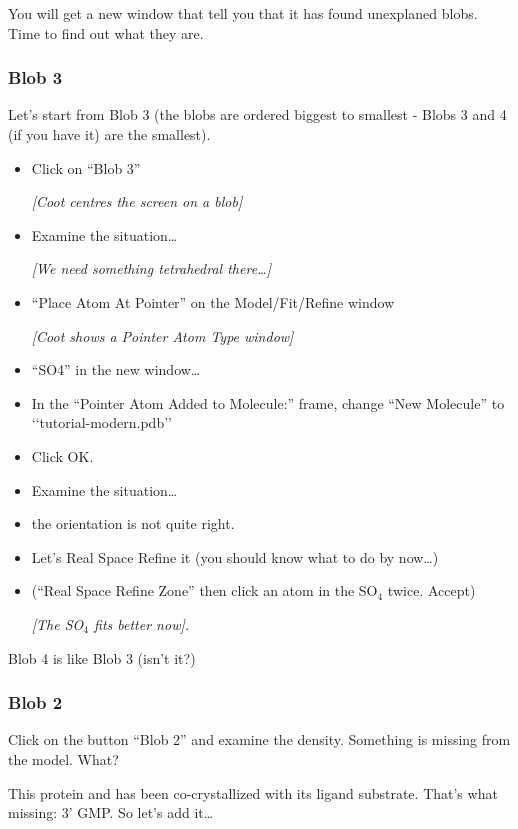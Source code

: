 \documentclass{article}
\begin{document}
You will get a new window that tell you that it has found unexplaned
blobs.  Time to find out what they are.

\subsubsection{Blob 3}
Let's start from Blob 3 (the blobs are ordered biggest to smallest -
Blobs 3 and 4 (if you have it) are the smallest).

\begin{itemize}
\item Click on ``Blob 3''

\textsl{ [Coot centres the screen on a blob]}

\item Examine the situation\ldots

  \emph{[We need something tetrahedral there\ldots]}
  
\item \textsf{``Place Atom At Pointer''} on the Model/Fit/Refine
  window

\textsl{ [Coot shows a Pointer Atom Type window]}

\item \textsf{``SO4''} in the new window\ldots
\item In the ``Pointer Atom Added to Molecule:'' frame, change ``New
  Molecule'' to `\textsf{`tutorial-modern.pdb''}
\item Click \textsf{OK}.
\item Examine the situation\ldots
\item the orientation is not quite right.
\item Let's Real Space Refine it (you should know what to do by now\ldots)
\item (\textsf{``Real Space Refine Zone''} then click an atom in the
  SO$_4$ twice.  Accept)

\textsl{[The SO$_4$ fits better now].}

\end{itemize}

Blob 4 is like Blob 3 (isn't it?)

\subsubsection{Blob 2}
Click on the button \textsf{``Blob 2''} and examine the density.
Something is missing from the model.  What?

This protein and has been co-crystallized with its ligand substrate.
That's what missing: 3' GMP.  So let's add it\ldots
\end{document}
